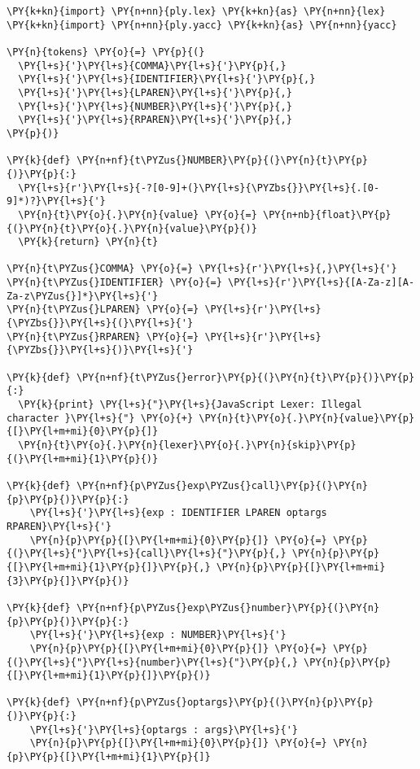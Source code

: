 \begin{Verbatim}[commandchars=\\\{\}]
\PY{k+kn}{import} \PY{n+nn}{ply.lex} \PY{k+kn}{as} \PY{n+nn}{lex}
\PY{k+kn}{import} \PY{n+nn}{ply.yacc} \PY{k+kn}{as} \PY{n+nn}{yacc}

\PY{n}{tokens} \PY{o}{=} \PY{p}{(}
  \PY{l+s}{'}\PY{l+s}{COMMA}\PY{l+s}{'}\PY{p}{,}
  \PY{l+s}{'}\PY{l+s}{IDENTIFIER}\PY{l+s}{'}\PY{p}{,}
  \PY{l+s}{'}\PY{l+s}{LPAREN}\PY{l+s}{'}\PY{p}{,}
  \PY{l+s}{'}\PY{l+s}{NUMBER}\PY{l+s}{'}\PY{p}{,}
  \PY{l+s}{'}\PY{l+s}{RPAREN}\PY{l+s}{'}\PY{p}{,}
\PY{p}{)}

\PY{k}{def} \PY{n+nf}{t\PYZus{}NUMBER}\PY{p}{(}\PY{n}{t}\PY{p}{)}\PY{p}{:}
  \PY{l+s}{r'}\PY{l+s}{-?[0-9]+(}\PY{l+s}{\PYZbs{}}\PY{l+s}{.[0-9]*)?}\PY{l+s}{'}
  \PY{n}{t}\PY{o}{.}\PY{n}{value} \PY{o}{=} \PY{n+nb}{float}\PY{p}{(}\PY{n}{t}\PY{o}{.}\PY{n}{value}\PY{p}{)}
  \PY{k}{return} \PY{n}{t}

\PY{n}{t\PYZus{}COMMA} \PY{o}{=} \PY{l+s}{r'}\PY{l+s}{,}\PY{l+s}{'}
\PY{n}{t\PYZus{}IDENTIFIER} \PY{o}{=} \PY{l+s}{r'}\PY{l+s}{[A-Za-z][A-Za-z\PYZus{}]*}\PY{l+s}{'}
\PY{n}{t\PYZus{}LPAREN} \PY{o}{=} \PY{l+s}{r'}\PY{l+s}{\PYZbs{}}\PY{l+s}{(}\PY{l+s}{'}
\PY{n}{t\PYZus{}RPAREN} \PY{o}{=} \PY{l+s}{r'}\PY{l+s}{\PYZbs{}}\PY{l+s}{)}\PY{l+s}{'}

\PY{k}{def} \PY{n+nf}{t\PYZus{}error}\PY{p}{(}\PY{n}{t}\PY{p}{)}\PY{p}{:}
  \PY{k}{print} \PY{l+s}{"}\PY{l+s}{JavaScript Lexer: Illegal character }\PY{l+s}{"} \PY{o}{+} \PY{n}{t}\PY{o}{.}\PY{n}{value}\PY{p}{[}\PY{l+m+mi}{0}\PY{p}{]}
  \PY{n}{t}\PY{o}{.}\PY{n}{lexer}\PY{o}{.}\PY{n}{skip}\PY{p}{(}\PY{l+m+mi}{1}\PY{p}{)}

\PY{k}{def} \PY{n+nf}{p\PYZus{}exp\PYZus{}call}\PY{p}{(}\PY{n}{p}\PY{p}{)}\PY{p}{:}
    \PY{l+s}{'}\PY{l+s}{exp : IDENTIFIER LPAREN optargs RPAREN}\PY{l+s}{'}
    \PY{n}{p}\PY{p}{[}\PY{l+m+mi}{0}\PY{p}{]} \PY{o}{=} \PY{p}{(}\PY{l+s}{"}\PY{l+s}{call}\PY{l+s}{"}\PY{p}{,} \PY{n}{p}\PY{p}{[}\PY{l+m+mi}{1}\PY{p}{]}\PY{p}{,} \PY{n}{p}\PY{p}{[}\PY{l+m+mi}{3}\PY{p}{]}\PY{p}{)}
    
\PY{k}{def} \PY{n+nf}{p\PYZus{}exp\PYZus{}number}\PY{p}{(}\PY{n}{p}\PY{p}{)}\PY{p}{:}
    \PY{l+s}{'}\PY{l+s}{exp : NUMBER}\PY{l+s}{'}
    \PY{n}{p}\PY{p}{[}\PY{l+m+mi}{0}\PY{p}{]} \PY{o}{=} \PY{p}{(}\PY{l+s}{"}\PY{l+s}{number}\PY{l+s}{"}\PY{p}{,} \PY{n}{p}\PY{p}{[}\PY{l+m+mi}{1}\PY{p}{]}\PY{p}{)}
    
\PY{k}{def} \PY{n+nf}{p\PYZus{}optargs}\PY{p}{(}\PY{n}{p}\PY{p}{)}\PY{p}{:}
    \PY{l+s}{'}\PY{l+s}{optargs : args}\PY{l+s}{'}
    \PY{n}{p}\PY{p}{[}\PY{l+m+mi}{0}\PY{p}{]} \PY{o}{=} \PY{n}{p}\PY{p}{[}\PY{l+m+mi}{1}\PY{p}{]}
    

\end{Verbatim}
